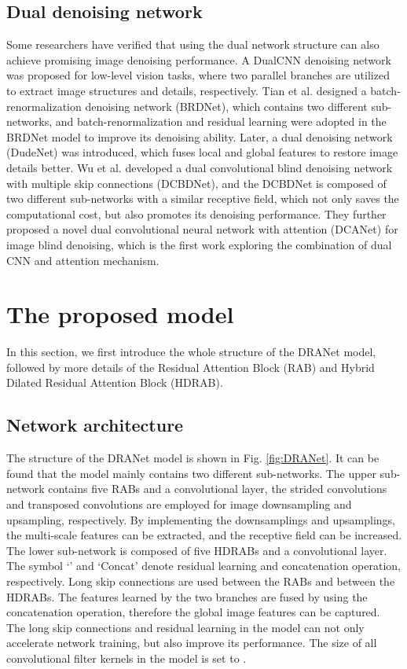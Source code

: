 \documentclass[3p,times]{elsarticle}
\begin{document}
\subsection{Dual denoising network}
Some researchers have verified that using the dual network structure can also achieve promising image denoising performance. A DualCNN \cite{Pan2018, Pan2022} denoising network was proposed for low-level vision tasks, where two parallel branches are utilized to extract image structures and details, respectively. Tian et al. \cite{Tian2020} designed a batch-renormalization denoising network (BRDNet), which contains two different sub-networks, and batch-renormalization \cite{Ioffe2017} and residual learning were adopted in the BRDNet model to improve its denoising ability. Later, a dual denoising network (DudeNet) \cite{Tian2021} was introduced, which fuses local and global features to restore image details better. Wu et al. \cite{WuS2023} developed a dual convolutional blind denoising network with multiple skip connections (DCBDNet), and the DCBDNet is composed of two different sub-networks with a similar receptive field, which not only saves the computational cost, but also promotes its denoising performance. They further proposed a novel dual convolutional neural network with attention (DCANet) \cite{WuG2023} for image blind denoising, which is the first work exploring the combination of dual CNN and attention mechanism.

\section{The proposed model}\label{Proposed_model}
In this section, we first introduce the whole structure of the DRANet model, followed by more details of the Residual Attention Block (RAB) and Hybrid Dilated Residual Attention Block (HDRAB).

\subsection{Network architecture}
The structure of the DRANet model is shown in Fig. \ref{fig:DRANet}. It can be found that the model mainly contains two different sub-networks. The upper sub-network contains five RABs and a convolutional layer, the  strided convolutions and  transposed convolutions are employed for image downsampling and upsampling, respectively. By implementing the downsamplings and upsamplings, the multi-scale features can be extracted, and the receptive field can be increased. The lower sub-network is composed of five HDRABs and a convolutional layer. The symbol `' and `Concat' denote residual learning and concatenation operation, respectively. Long skip connections are used between the RABs and between the HDRABs. The features learned by the two branches are fused by using the concatenation operation, therefore the global image features can be captured. The long skip connections and residual learning \cite{He2016} in the model can not only accelerate network training, but also improve its performance. The size of all convolutional filter kernels in the model is set to .
\end{document}
